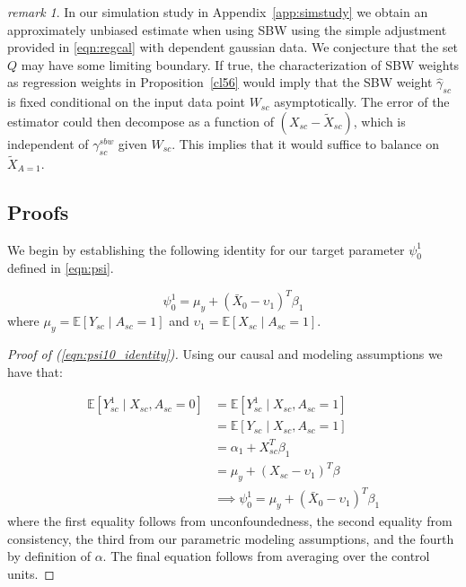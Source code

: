 \documentclass[aoas]{imsart}
\theoremstyle{plain}
\theoremstyle{remark}
\newtheorem{remark}{remark}
\begin{document}
\begin{appendix}
\begin{remark}\label{remark:sbwspeculation}
    In our simulation study in Appendix~\ref{app:simstudy} we obtain an approximately unbiased estimate when using SBW using the simple adjustment provided in \eqref{eqn:regcal} with dependent gaussian data. We conjecture that the set $Q$ may have some limiting boundary. If true, the characterization of SBW weights as regression weights in Proposition~\ref{cl56} would imply that the SBW weight $\hat{\gamma}_{sc}$ is fixed conditional on the input data point $W_{sc}$ asymptotically. The error of the estimator could then decompose as a function of $(X_{sc} - \tilde{X}_{sc})$, which is independent of $\gamma_{sc}^{sbw}$ given $W_{sc}$. This implies that it would suffice to balance on $\tilde{X}_{A=1}$.
\end{remark}

\subsection{Proofs}\label{app:AsecIII}

We begin by establishing the following identity for our target parameter $\psi_0^1$ defined in \eqref{eqn:psi}.

\begin{equation}\label{eqn:psi10_identity}
\psi^1_0 = \mu_y + (\bar{X}_0 - \upsilon_1)^T\beta_1
\end{equation}
%
where $\mu_y = \mathbb{E}[Y_{sc} \mid A_{sc} = 1]$ and $\upsilon_1 = \mathbb{E}[X_{sc} \mid A_{sc} = 1]$.

\begin{proof}[Proof of (\ref{eqn:psi10_identity})]
Using our causal and modeling assumptions we have that:

\begin{align*}
\mathbb{E}[Y_{sc}^1 \mid X_{sc}, A_{sc} = 0] &= \mathbb{E}[Y_{sc}^1 \mid X_{sc}, A_{sc} = 1] \\
&= \mathbb{E}[Y_{sc} \mid X_{sc}, A_{sc} = 1] \\
&= \alpha_1 + X_{sc}^T\beta_1 \\
&= \mu_y + (X_{sc} - \upsilon_1)^T\beta \\
&\implies \psi_0^1 = \mu_y + (\bar{X}_0 - \upsilon_1)^T\beta_1
\end{align*}
%
where the first equality follows from unconfoundedness, the second equality from consistency, the third from our parametric modeling assumptions, and the fourth by definition of $\alpha$. The final equation follows from averaging over the control units.
\end{proof}
%


\end{appendix}
\end{document}

